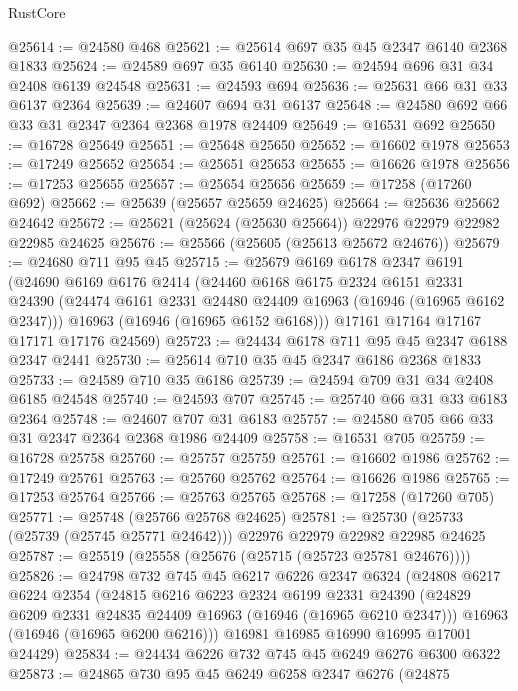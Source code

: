 \begin{lexlean}{RustCore}
\begin{coremodule}
@25614 := @24580 @468
@25621 := @25614 @697 @35 @45 @2347 @6140 @2368 @1833
@25624 := @24589 @697 @35 @6140
@25630 := @24594 @696 @31 @34 @2408 @6139 @24548
@25631 := @24593 @694
@25636 := @25631 @66 @31 @33 @6137 @2364
@25639 := @24607 @694 @31 @6137
@25648 := @24580 @692 @66 @33 @31 @2347 @2364 @2368 @1978 @24409
@25649 := @16531 @692
@25650 := @16728 @25649
@25651 := @25648 @25650
@25652 := @16602 @1978
@25653 := @17249 @25652
@25654 := @25651 @25653
@25655 := @16626 @1978
@25656 := @17253 @25655
@25657 := @25654 @25656
@25659 := @17258 (@17260 @692)
@25662 := @25639 (@25657 @25659 @24625)
@25664 := @25636 @25662 @24642
@25672 := @25621 (@25624 (@25630 @25664)) @22976 @22979 @22982 @22985 @24625
@25676 := @25566 (@25605 (@25613 @25672 @24676))
@25679 := @24680 @711 @95 @45
@25715 := @25679
    @6169
    @6178
    @2347
    @6191
    (@24690
      @6169
      @6176
      @2414
      (@24460
        @6168
        @6175
        @2324
        @6151
        @2331
        @24390
        (@24474 @6161 @2331 @24480 @24409 @16963 (@16946 (@16965 @6162 @2347)))
        @16963
        (@16946 (@16965 @6152 @6168)))
      @17161
      @17164
      @17167
      @17171
      @17176
      @24569)
@25723 := @24434 @6178 @711 @95 @45 @2347 @6188 @2347 @2441
@25730 := @25614 @710 @35 @45 @2347 @6186 @2368 @1833
@25733 := @24589 @710 @35 @6186
@25739 := @24594 @709 @31 @34 @2408 @6185 @24548
@25740 := @24593 @707
@25745 := @25740 @66 @31 @33 @6183 @2364
@25748 := @24607 @707 @31 @6183
@25757 := @24580 @705 @66 @33 @31 @2347 @2364 @2368 @1986 @24409
@25758 := @16531 @705
@25759 := @16728 @25758
@25760 := @25757 @25759
@25761 := @16602 @1986
@25762 := @17249 @25761
@25763 := @25760 @25762
@25764 := @16626 @1986
@25765 := @17253 @25764
@25766 := @25763 @25765
@25768 := @17258 (@17260 @705)
@25771 := @25748 (@25766 @25768 @24625)
@25781 := @25730 (@25733 (@25739 (@25745 @25771 @24642))) @22976 @22979 @22982 @22985 @24625
@25787 := @25519 (@25558 (@25676 (@25715 (@25723 @25781 @24676))))
@25826 := @24798
    @732
    @745
    @45
    @6217
    @6226
    @2347
    @6324
    (@24808
      @6217
      @6224
      @2354
      (@24815
        @6216
        @6223
        @2324
        @6199
        @2331
        @24390
        (@24829 @6209 @2331 @24835 @24409 @16963 (@16946 (@16965 @6210 @2347)))
        @16963
        (@16946 (@16965 @6200 @6216)))
      @16981
      @16985
      @16990
      @16995
      @17001
      @24429)
@25834 := @24434 @6226 @732 @745 @45 @6249 @6276 @6300 @6322
@25873 := @24865
    @730
    @95
    @45
    @6249
    @6258
    @2347
    @6276
    (@24875

\end{coremodule}
\end{lexlean}

